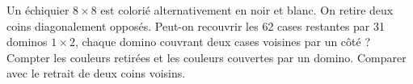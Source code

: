 \documentclass[11pt]{article}
\begin{document}
Un échiquier \(8 \times  8\) est colorié alternativement en noir et blanc. On retire deux coins diagonalement opposés. Peut-on recouvrir les 62 cases restantes par 31 dominos \(1 \times  2\), chaque domino couvrant deux cases voisines par un côté ? Compter les couleurs retirées et les couleurs couvertes par un domino. Comparer avec le retrait de deux coins voisins.\par
\vspace{5pt}
\end{document}
